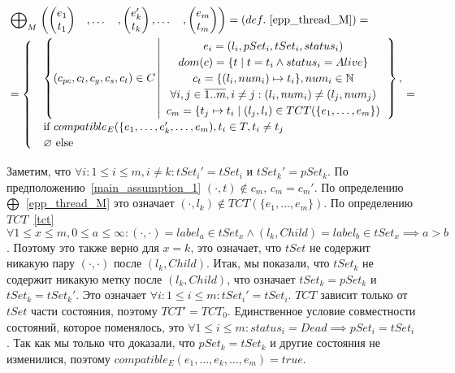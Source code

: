 \begin{align}
& \mathrel{\bigoplus}_M
\begin{pmatrix}
\begin{pmatrix}
e_1 \\
t_1 
\end{pmatrix}& ,
\dots& ,
\begin{pmatrix}
e_k' \\
t_k 
\end{pmatrix},
\dots& ,
\begin{pmatrix}
e_m \\
t_m 
\end{pmatrix}
\end{pmatrix} = (def.~\ref{epp_thread_M}) =\nonumber \\
& = \begin{cases}
& \left\lbrace (c_{pc},c_l,c_g,c_s, c_t) \in C 
\left| 
\begin{array}{c}
e_i = (l_i, pSet_i, tSet_i, status_i) \\
dom(c) = \{t \mid t = t_i \land status_i = Alive\}\\
c_t = \{(l_i, num_i) \mapsto t_i\}, num_i \in \mathbb{N} \\
\forall i, j \in \overline{1..m}, i \neq j: (l_i, num_i) \neq (l_j, num_j)\\
c_m = \{ t_j \mapsto t_i \mid (l_j, l_i) \in TCT(\{e_1, \dots, e_m\}) \\
\end{array}
\right.
\right\rbrace, \\
& \mbox{if } compatible_{E}(\{e_1, \dots, e_k', \dots, e_m), t_i \in T, t_i \neq t_j \\
& \varnothing \mbox{ else}
\end{cases} = \nonumber
\end{align}

Заметим, что $\forall i: 1 \le i \le m, i \neq k: tSet_i' = tSet_i$ и $tSet_k' = pSet_k$.
По предположению~\ref{main_assumption_1} $(\cdot, t) \notin c_m$, $c_m = c_m'$.
По определению $\mathrel{\bigoplus}$~\ref{epp_thread_M} это означает $(\cdot, l_k) \notin TCT(\{e_1, \dots, e_m\})$.
По определению $TCT$~\ref{tct} $\forall 1 \le x \le m, 0 \le a \le \infty: (\cdot, \cdot) = label_a \in tSet_x \land (l_k, Child) = label_b \in tSet_x \implies a > b$.
Поэтому это также верно для $x = k$, это означает, что $tSet$ не содержит никакую пару $(\cdot, \cdot)$ после $(l_k, Child)$.
Итак, мы показали, что $tSet_k$ не содержит никакую метку после $(l_k, Child)$, что означает
$tSet_k = pSet_k$ и $tSet_k = tSet_k'$. 
Это означает $\forall i: 1 \le i \le m: tSet_i' = tSet_i$.
$TCT$ зависит только от $tSet$ части состояния, поэтому $TCT' = TCT_0$.
Единственное условие совместности состояний, которое поменялось, это $\forall 1 \le i \le m: status_i = Dead \implies pSet_i = tSet_i$.
Так как мы только что доказали, что $pSet_k = tSet_k$ и другие состояния не изменилися, поэтому $compatible_E(e_1, \dots, e_k, \dots, e_m) = true$.

